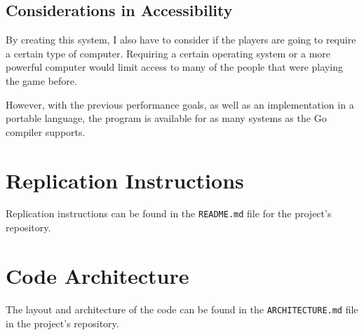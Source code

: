 \documentclass[10pt,twocolumn]{article}
\begin{document}
\subsection{Considerations in Accessibility}

By creating this system, I also have to consider if the players are going to
require a certain type of computer. Requiring a certain operating system or a
more powerful computer would limit access to many of the people that were
playing the game before.

However, with the previous performance goals, as well as an implementation in a
portable language, the program is available for as many systems as the Go
compiler supports.

\appendix

\section{Replication Instructions}

Replication instructions can be found in the \verb|README.md| file for the
project's repository.

\section{Code Architecture}

The layout and architecture of the code can be found in the
\verb|ARCHITECTURE.md| file in the project's repository.

\printbibliography
\end{document}
